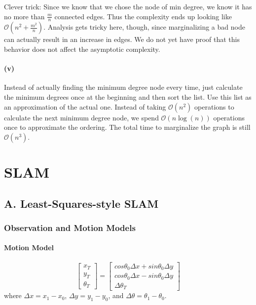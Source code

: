 \documentclass[12pt]{article}
\begin{document}
Clever trick: Since we know that we chose the node of min degree, we know it has
no more than $\frac{m}{n}$ connected edges. Thus the complexity ends up looking
like $\mathcal{O}(n^2 + \frac{m^2}{n})$. Analysis gets tricky here, though,
since marginalizing a bad node can actually result in an increase in edges. We
do not yet have proof that this behavior does not affect the asymptotic
complexity.

\paragraph{(v)}
Instead of actually finding the minimum degree node every time, just calculate
the minimum degrees once at the beginning and then sort the list. Use this list
as an approximation of the actual one. Instead of taking $\mathcal{O}(n^2)$
operations to calculate the next minimum degree node, we spend
$\mathcal{O}(n\log(n))$ operations once to approximate the ordering. The total
time to marginalize the graph is still $\mathcal{O}(n^3)$.

\section{SLAM}

\subsection*{A. Least-Squares-style SLAM}

\subsubsection*{Observation and Motion Models}

\paragraph{Motion Model}
\[ \left[ \begin{array}{c}
x_T \\
y_T \\
\theta_T \end{array} \right]  =
 \left[ \begin{array}{c}
cos\theta_0\Delta x + sin\theta_0\Delta y \\
cos\theta_0\Delta x - sin\theta_0\Delta y \\
\Delta \theta_T \end{array} \right]\]
where $\Delta x = x_1 - x_0$, $\Delta y = y_1 - y_0$, and $\Delta \theta = \theta_1 - \theta_0$.\\
\end{document}
